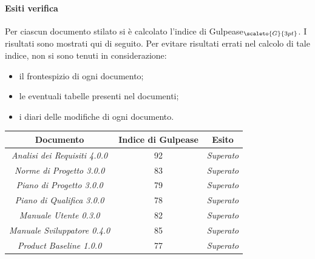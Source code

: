 {{{{{{{{{{{\paragraph{Esiti verifica}\label{ResocontoAttivitàDiVerificaRevisioneDiQualificaVerificheDiProdottoStrategiaAdoperataPerLAnalisiStaticaDeiDocumentiEsitiDiVerifica}
Per ciascun documento stilato si è calcolato l’indice di Gulpease$_{\scaleto{G}{3pt}}$. I risultati sono mostrati qui di seguito.
Per evitare risultati errati nel calcolo di tale indice, non si sono tenuti in considerazione:
\begin{itemize}
	\item il frontespizio di ogni documento;
	\item le eventuali tabelle presenti nel documenti;
	\item i diari delle modifiche di ogni documento.
\end{itemize}
\quad
\def\tabularxcolumn#1{m{#1}}
{
	\begin{center}
		\renewcommand{\arraystretch}{1.4}
		\begin{tabularx}{11,70cm}{|c|c|c|}
			\hline
			\rowcolor{airforceblue}
			\textbf{Documento} & \textbf{Indice di Gulpease} & \textbf{Esito}\\
			\hline
			\textit{Analisi dei Requisiti 4.0.0} & 92 & \textit{Superato}\\
			\hline
			\textit{Norme di Progetto 3.0.0} & 83 & \textit{Superato}\\
			\hline
			\textit{Piano di Progetto 3.0.0} & 79 & \textit{Superato}\\
			\hline
			\textit{Piano di Qualifica 3.0.0} & 78 & \textit{Superato}\\
			\hline
			\textit{Manuale Utente 0.3.0} & 82 & \textit{Superato}\\
			\hline
			\textit{Manuale Sviluppatore 0.4.0} & 85 & \textit{Superato}\\
			\hline
			\textit{Product Baseline 1.0.0} & 77 & \textit{Superato}\\
			\hline
		\end{tabularx}
	\end{center}

}}}}}}}}}}}}
